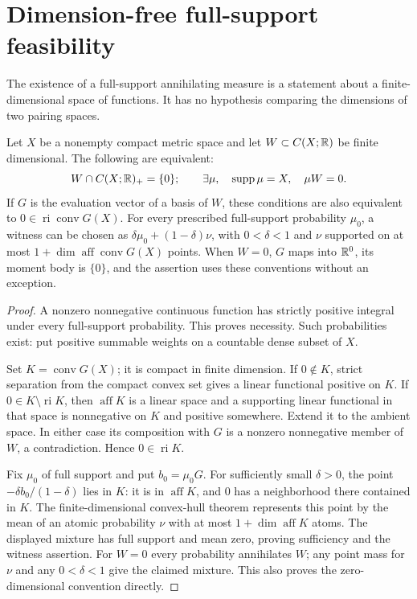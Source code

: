 \section{Dimension-free full-support feasibility}
\label{sec:kernel-feasibility}
The existence of a full-support annihilating measure is a statement
about a finite-dimensional space of functions. It has no hypothesis
comparing the dimensions of two pairing spaces.

\begin{lemma}
\label{lem:dimension-free-feasibility}
Let $X$ be a nonempty compact metric space and let $W\subset C(X;\mathbb R)$
be finite dimensional. The following are equivalent:
\[
 W\cap C(X;\mathbb R)_+=\{0\};\qquad
 \exists\mu,\quad\operatorname{supp}\mu=X,\quad\mu W=0.
\]
If $G$ is the evaluation vector of a basis of $W$, these conditions
are also equivalent to $0\in\operatorname{ri}\operatorname{conv}G(X)$.
For every prescribed full-support probability $\mu_0$, a witness can
be chosen as $\delta\mu_0+(1-\delta)\nu$, with $0<\delta<1$ and
$\nu$ supported on at most $1+\dim\operatorname{aff}\operatorname{conv}G(X)$
points. When $W=0$, $G$ maps into $\mathbb R^0$, its moment body is $\{0\}$,
and the assertion uses these conventions without an exception.
\end{lemma}
\begin{proof}
A nonzero nonnegative continuous function has strictly positive integral
under every full-support probability. This proves necessity. Such
probabilities exist: put positive summable weights on a countable dense
subset of $X$.

Set $K=\operatorname{conv}G(X)$; it is compact in finite dimension.
If $0\notin K$, strict separation from the compact convex set gives a
linear functional positive on $K$. If $0\in K\setminus\operatorname{ri}K$,
then $\operatorname{aff}K$ is a linear space and a supporting linear
functional in that space is nonnegative on $K$ and positive somewhere.
Extend it to the ambient space. In either case its composition with $G$
is a nonzero nonnegative member of $W$, a contradiction. Hence
$0\in\operatorname{ri}K$.

Fix $\mu_0$ of full support and put $b_0=\mu_0G$. For sufficiently
small $\delta>0$, the point $-\delta b_0/(1-\delta)$ lies in $K$:
it is in $\operatorname{aff}K$, and $0$ has a neighborhood there
contained in $K$. The finite-dimensional convex-hull theorem represents
this point by the mean of an atomic probability $\nu$ with at most
$1+\dim\operatorname{aff}K$ atoms. The displayed mixture has full
support and mean zero, proving sufficiency and the witness assertion.
For $W=0$ every probability annihilates $W$; any point mass for $\nu$
and any $0<\delta<1$ give the claimed mixture. This also proves the
zero-dimensional convention directly.
\end{proof}
